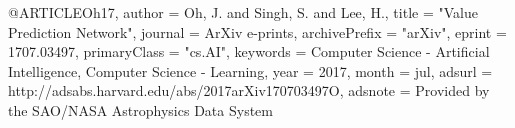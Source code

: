 @ARTICLE{Oh17,
	author = {{Oh}, J. and {Singh}, S. and {Lee}, H.},
	title = "{Value Prediction Network}",
	journal = {ArXiv e-prints},
	archivePrefix = "arXiv",
	eprint = {1707.03497},
	primaryClass = "cs.AI",
	keywords = {Computer Science - Artificial Intelligence, Computer Science - Learning},
	year = 2017,
	month = jul,
	adsurl = {http://adsabs.harvard.edu/abs/2017arXiv170703497O},
	adsnote = {Provided by the SAO/NASA Astrophysics Data System}
}
